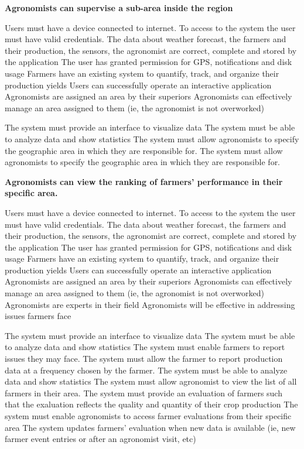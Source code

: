 \begin{itemize}
 \textbf{Agronomists can supervise a sub-area inside the region}
\begin{itemize}
  Users must have a device connected to internet.
 To access to the system the user must have valid credentials.
 The data about weather forecast, the farmers and their production, the sensors, the agronomist are correct, complete and stored by the application
 The user has granted permission for GPS, notifications and disk usage
 Farmers have an existing system to quantify, track, and organize their production yields
 Users can successfully operate an interactive application
 Agronomists are assigned an area by their superiors
 Agronomists can effectively manage an area assigned to them (ie, the agronomist is not overworked)

 The system must provide an interface to visualize data
 The system must be able to analyze data and show statistics
 The system must allow agronomists to specify the geographic area in which they are responsible for.
 The system must allow agronomists to specify the geographic area in which they are responsible for.
\end{itemize}

 \textbf{Agronomists can view the ranking of farmers’ performance in their specific area.}
\begin{itemize}
  Users must have a device connected to internet.
 To access to the system the user must have valid credentials.
 The data about weather forecast, the farmers and their production, the sensors, the agronomist are correct, complete and stored by the application
 The user has granted permission for GPS, notifications and disk usage
 Farmers have an existing system to quantify, track, and organize their production yields
 Users can successfully operate an interactive application
 Agronomists are assigned an area by their superiors
 Agronomists can effectively manage an area assigned to them (ie, the agronomist is not overworked)
 Agronomists are experts in their field
 Agronomists will be effective in addressing issues farmers face


 The system must provide an interface to visualize data
 The system must be able to analyze data and show statistics
 The system must enable farmers to report issues they may face.
 The system must allow the farmer to report production data at a frequency chosen by the farmer.
  The system must be able to analyze data and show statistics
  The system must allow agronomist to view the list of all farmers in their area.
  The system must provide an evaluation of farmers such that the exaluation reflects the quality and quantity of their crop production
  The system must enable agronomists to access farmer evaluations from their specific area
  The system updates farmers' evaluation when new data is available (ie, new farmer event entries or after an agronomist visit, etc)
\end{itemize}


\end{itemize}
